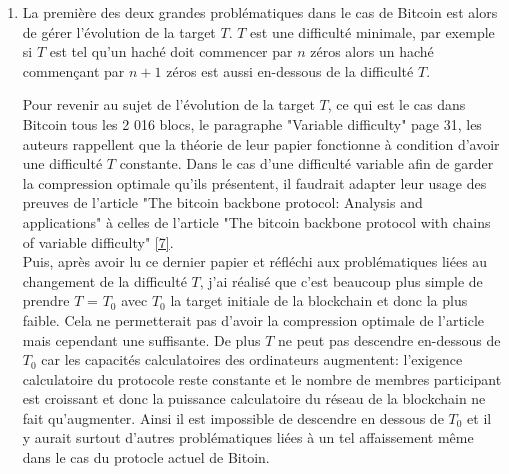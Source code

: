 \documentclass[12pt,a4paper]{article}
\newcommand{\source}[1]{\hyperlink{#1}{[#1]}}
\begin{document}
	\begin{enumerate}
	\item La première des deux grandes problématiques dans le cas de Bitcoin est alors de gérer l'évolution de la target $T$. $T$ est une difficulté minimale, par exemple si $T$ est tel qu'un haché doit commencer par $n$ zéros alors un haché commençant par $n + 1$ zéros est aussi en-dessous de la difficulté $T$. %
	
	Pour revenir au sujet de l'évolution de la target $T$, ce qui est le cas dans Bitcoin tous les 2 016 blocs, le paragraphe "Variable difficulty" page 31, les auteurs rappellent que la théorie de leur papier fonctionne à condition d'avoir une difficulté $T$ constante. Dans le cas d'une difficulté variable afin de garder la compression optimale qu'ils présentent, il faudrait adapter leur usage des preuves de l'article "The bitcoin backbone protocol: Analysis and applications" à celles de l'article "The bitcoin backbone protocol with chains of variable difficulty" \source{7}.\\ %
	Puis, après avoir lu ce dernier papier et réfléchi aux problématiques liées au changement de la difficulté $T$, j'ai réalisé que c'est beaucoup plus simple de prendre $T$ = $T_0$ avec $T_0$ la target initiale de la blockchain et donc la plus faible. Cela ne permetterait pas d'avoir la compression optimale de l'article mais cependant une suffisante. De plus $T$ ne peut pas descendre en-dessous de $T_0$ car les capacités calculatoires des ordinateurs augmentent: l'exigence calculatoire du protocole reste constante et le nombre de membres participant est croissant et donc la puissance calculatoire du réseau de la blockchain ne fait qu'augmenter. Ainsi il est impossible de descendre en dessous de $T_0$ et il y aurait surtout d'autres problématiques liées à un tel affaissement même dans le cas du protocle actuel de Bitoin.\\ %
	

\end{enumerate}
\end{document}
